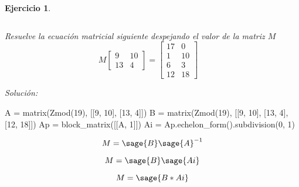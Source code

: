 \documentclass[12pt]{amsart}
\newtheorem{ejer}{Ejercicio}
\begin{document}
\begin{ejer}
\begin{minipage}{\textwidth}
\begin{tcolorbox}[colback = blue!20!white,title=Versión Sistema Matricial]
\[\]\end{tcolorbox}
\end{minipage} \newline
\noindent\begin{minipage}{\textwidth} 
\begin{tcolorbox}[colback = red!20!white,title=Versión Ecuación Matricial]
Resuelve la ecuación matricial siguiente despejando el valor de la matriz $M$
\[M \left[\begin{array}{rr}
9 & 10 \\
13 & 4
\end{array}\right] = \left[\begin{array}{rr}
17 & 0 \\
1 & 10 \\
6 & 3 \\
12 & 18
\end{array}\right] \quad 
\]
\end{tcolorbox}
\end{minipage}%
\end{ejer}


{\it Soluci\'on:}

\begin{sageblock}
	A = matrix(Zmod(19), [[9, 10], [13, 4]])
	B = matrix(Zmod(19), [[9, 10], [13, 4], [12, 18]])
	Ap = block_matrix([[A, 1]])
	Ai = Ap.echelon_form().subdivision(0, 1)
\end{sageblock}

$$
	M = \sage{B} \sage{A}^{-1}
$$

$$
	M = \sage{B} \sage{Ai}
$$

$$
	M = \sage{B * Ai}
$$

\end{document}
